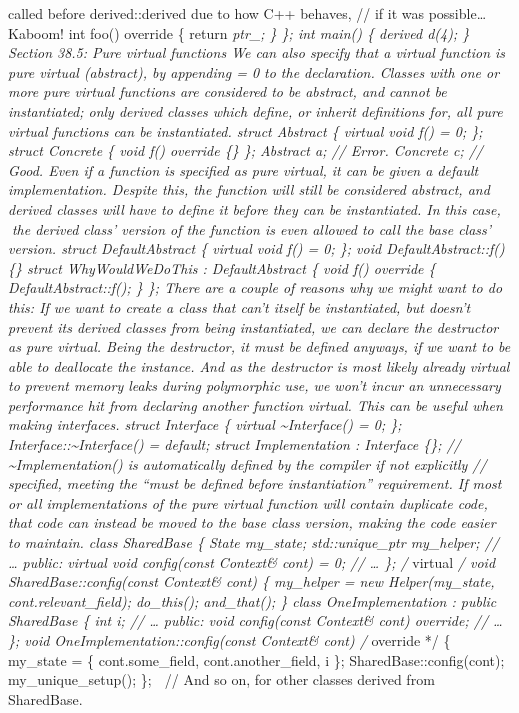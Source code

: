 called before derived::derived due to how C++ behaves, // if it was
possible\ldots{} Kaboom! int foo() override \{ return \emph{ptr\_; \}
\}; int main() \{ derived d(4); \} Section 38.5: Pure virtual functions
We can also specify that a virtual function is pure virtual (abstract),
by appending = 0 to the declaration. Classes with one or more pure
virtual functions are considered to be abstract, and cannot be
instantiated; only derived classes which deﬁne, or inherit deﬁnitions
for, all pure virtual functions can be instantiated. struct Abstract \{
virtual void f() = 0; \}; struct Concrete \{ void f() override \{\} \};
Abstract a; // Error. Concrete c; // Good. Even if a function is
speciﬁed as pure virtual, it can be given a default implementation.
Despite this, the function will still be considered abstract, and
derived classes will have to deﬁne it before they can be instantiated.
In this case, the derived class' version of the function is even
allowed to call the base class' version. struct DefaultAbstract \{
virtual void f() = 0; \}; void DefaultAbstract::f() \{\} struct
WhyWouldWeDoThis : DefaultAbstract \{ void f() override \{
DefaultAbstract::f(); \} \}; There are a couple of reasons why we might
want to do this: If we want to create a class that can't itself be
instantiated, but doesn't prevent its derived classes from being
instantiated, we can declare the destructor as pure virtual. Being the
destructor, it must be deﬁned anyways, if we want to be able to
deallocate the instance. And as the destructor is most likely already
virtual to prevent memory leaks during polymorphic use, we won't incur
an unnecessary performance hit from declaring another function virtual.
This can be useful when making interfaces. struct Interface \{ virtual
\textasciitilde Interface() = 0; \};
Interface::\textasciitilde Interface() = default; struct Implementation
: Interface \{\}; // \textasciitilde Implementation() is automatically
defined by the compiler if not explicitly // specified, meeting the
``must be defined before instantiation'' requirement. If most or all
implementations of the pure virtual function will contain duplicate
code, that code can instead be moved to the base class version, making
the code easier to maintain. class SharedBase \{ State my\_state;
std::unique\_ptr my\_helper; // \ldots{} public: virtual void
config(const Context\& cont) = 0; // \ldots{} \}; /} virtual \emph{/
void SharedBase::config(const Context\& cont) \{ my\_helper = new
Helper(my\_state, cont.relevant\_field); do\_this(); and\_that(); \}
class OneImplementation : public SharedBase \{ int i; // \ldots{}
public: void config(const Context\& cont) override; // \ldots{} \}; void
OneImplementation::config(const Context\& cont) /} override */ \{
my\_state = \{ cont.some\_field, cont.another\_field, i \};
SharedBase::config(cont); my\_unique\_setup(); \};  // And so on, for
other classes derived from SharedBase.

